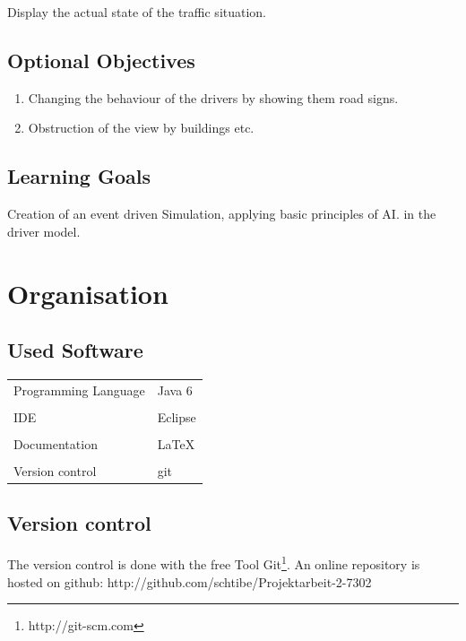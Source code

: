 \documentclass[a4paper,10pt,titlepage]{article}
\begin{document}
Display the actual state of the traffic situation. %
\newpage

\subsection{Optional Objectives}
\begin{enumerate}
 \item Changing the behaviour of the drivers by showing them road signs. %
 \item Obstruction of the view by buildings etc. %
\end{enumerate}

\subsection{Learning Goals}
Creation of an event driven Simulation, applying basic principles of AI. in the driver model.


\section{Organisation}

\subsection{Used Software}
\begin{tabular}{ll}
Programming Language & Java 6 \\
& \\
IDE & Eclipse \\
& \\
Documentation & \LaTeX \\
& \\
Version control & git \\
\end{tabular}

\subsection{Version control}
The version control is done with the free Tool Git\footnote[1]{http://git-scm.com}.
An online repository is hosted on github: \newline
http://github.com/schtibe/Projektarbeit-2-7302
\end{document}
